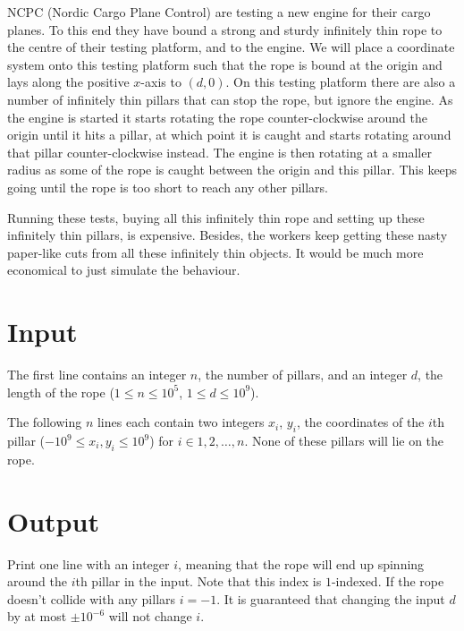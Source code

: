 
NCPC (Nordic Cargo Plane Control) are testing a new engine for their cargo planes. To this end they have bound a strong
and sturdy infinitely thin rope to the centre of their testing platform, and to the engine. We will place a coordinate system
onto this testing platform such that the rope is bound at the origin and lays along the positive $x$-axis to $(d, 0)$.
On this testing platform there are also a number of infinitely thin pillars that can stop the rope, but ignore the engine.
As the engine is started it starts rotating the rope counter-clockwise around the origin until it hits a pillar, at which point it 
is caught and starts rotating around that pillar counter-clockwise instead. The engine is then rotating at a smaller radius as some of
the rope is caught between the origin and this pillar. This keeps going until the rope is too short to reach any other pillars.

Running these tests, buying all this infinitely thin rope and setting up these infinitely thin pillars, is expensive. Besides, the
workers keep getting these nasty paper-like cuts from all these infinitely thin objects. It would be much more economical to just
simulate the behaviour. 

\section*{Input}

The first line contains an integer $n$, the number of pillars, and an integer $d$, the length of the rope 
($1 \leq n \leq 10^5$, $1 \leq d \leq 10^9$).

The following $n$ lines each contain two integers $x_i$, $y_i$, the coordinates of the
$i$th pillar ($-10^9 \leq x_i, y_i \leq 10^9$) for $i \in 1, 2, \ldots, n$. None of these pillars will lie on the rope.

\section*{Output}

Print one line with an integer $i$, meaning that the rope will end up spinning around the $i$th
pillar in the input. Note that this index is $1$-indexed. 
If the rope doesn't collide with any pillars $i = -1$. It is guaranteed that changing the input $d$ by at most
$\pm 10^{-6}$ will not change $i$.
